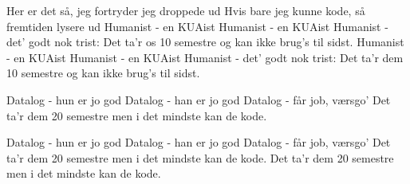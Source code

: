 \documentclass[a4paper,11pt]{article}
\begin{document}
\begin{song}
{        Her er det så, jeg fortryder jeg droppede ud
        Hvis bare jeg kunne kode, så fremtiden lysere ud
    }
     {
        Humanist - en KUAist
        Humanist - en KUAist
        Humanist - det’ godt nok trist:
        Det ta’r os 10 semestre
        og kan ikke brug’s til sidst.
    }
     {
        Humanist - en KUAist
        Humanist - en KUAist
        Humanist - det’ godt nok trist:
        Det ta’r dem 10 semestre
        og kan ikke brug’s til sidst.
    }
%


     {
        Datalog - hun er jo god
        Datalog - han er jo god
        Datalog - får job, værsgo’
        Det ta’r dem 20 semestre
        men i det mindste kan de kode.
    }

     {
        Datalog - hun er jo god
        Datalog - han er jo god
        Datalog - får job, værsgo’
        Det ta’r dem 20 semestre
        men i det mindste kan de kode.
        Det ta’r dem 20 semestre
        men i det mindste kan de kode.
    }
\end{song}
\end{document}
